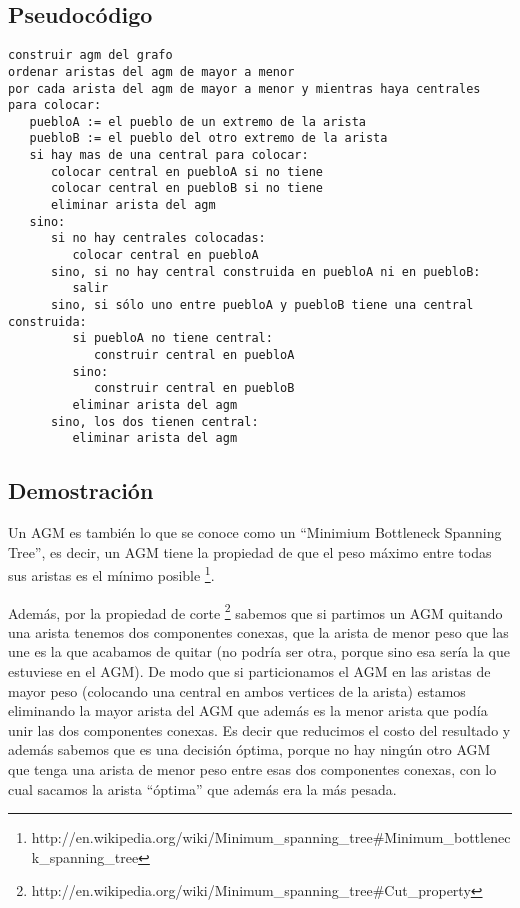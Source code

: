 \subsection{Pseudoc\'odigo}
\begin{verbatim}
construir agm del grafo
ordenar aristas del agm de mayor a menor
por cada arista del agm de mayor a menor y mientras haya centrales para colocar:
   puebloA := el pueblo de un extremo de la arista
   puebloB := el pueblo del otro extremo de la arista
   si hay mas de una central para colocar:
      colocar central en puebloA si no tiene
      colocar central en puebloB si no tiene
      eliminar arista del agm
   sino:
      si no hay centrales colocadas:
         colocar central en puebloA
      sino, si no hay central construida en puebloA ni en puebloB:
         salir
      sino, si sólo uno entre puebloA y puebloB tiene una central construida:
         si puebloA no tiene central:
            construir central en puebloA
         sino:
            construir central en puebloB
         eliminar arista del agm
      sino, los dos tienen central:
         eliminar arista del agm
\end{verbatim}

\subsection{Demostraci\'on}
Un AGM es también lo que se conoce como un ``Minimium Bottleneck Spanning Tree'', es decir, un AGM tiene la propiedad de que el peso máximo entre todas sus aristas
es el mínimo posible \footnote{http://en.wikipedia.org/wiki/Minimum\_spanning\_tree\#Minimum\_bottleneck\_spanning\_tree}.

Además, por la propiedad de corte \footnote{http://en.wikipedia.org/wiki/Minimum\_spanning\_tree\#Cut\_property} sabemos que si partimos un AGM quitando una arista
tenemos dos componentes conexas, que la arista de menor peso que las une es la que acabamos de quitar (no podría ser otra, porque sino esa sería la que estuviese
en el AGM). De modo que si particionamos el AGM en las aristas de mayor peso (colocando una central en ambos vertices de la arista) estamos eliminando la mayor arista
del AGM que además es la menor arista que podía unir las dos componentes conexas. Es decir que reducimos el costo del resultado y además sabemos que es una decisión óptima, porque no hay ningún otro AGM que tenga una arista de menor peso entre esas dos componentes conexas, con lo cual sacamos la arista ``óptima'' que además era la más pesada.

